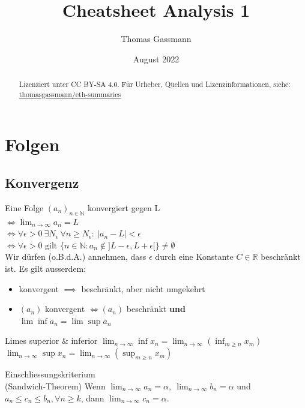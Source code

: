 \documentclass[a4paper,10pt]{article}
\title{Cheatsheet Analysis 1}
\author{Thomas Gassmann}
\date{August 2022}
\def\limn{\lim_{n\to \infty}}
\def\R{\mathbb{R}}
\begin{document}
\begin{abstract}
    \begin{center}
        Lizenziert unter CC BY-SA 4.0. Für Urheber, Quellen und Lizenzinformationen, siehe:\\
        \href{https://github.com/thomasgassmann/eth-summaries}{thomasgassmann/eth-summaries}
    \end{center}
\end{abstract}

\section{Folgen}
\subsection{Konvergenz}
Eine Folge $(a_n)_{n\in \mathbb{N}}$ konvergiert gegen L \\
 $\iff \lim_{n \to \infty} a_n = L $ \\ 
 $\iff \forall \epsilon > 0 \ \exists N_\epsilon \ \forall n \ge N_\epsilon : \ | a_n - L | < \epsilon$\\
 $\iff \forall \epsilon > 0\text{ gilt }\{ n\in\mathbb{N}:a_n\notin ]L-\epsilon,L+\epsilon[ \} \neq \emptyset $\\

Wir dürfen (o.B.d.A.) annehmen, dass $\epsilon$ durch eine Konstante $C \in \R$ beschränkt ist.
Es gilt ausserdem:
\begin{itemize}
 \item konvergent $\implies$ beschränkt, aber nicht umgekehrt
 \item $(a_n)$ konvergent $\iff (a_n)$ beschränkt \textbf{und} \\$\lim \inf a_n = \lim \sup a_n$
\end{itemize}


\begin{subbox}{Limes superior \& inferior}
$\limn \inf x_n = \limn \left( \inf_{m \ge n} x_m \right)$ \\
$\limn \sup x_n = \limn \left( \sup_{m \ge n} x_m \right)$
\end{subbox}

\begin{mainbox}{Einschliessungskriterium \\ (Sandwich-Theorem)}
Wenn $\limn a_n = \alpha, \ \limn b_n = \alpha$ und $a_n \le c_n \le b_n, \forall n \ge k$, dann $\limn c_n = \alpha$.
\end{mainbox}
\end{document}
